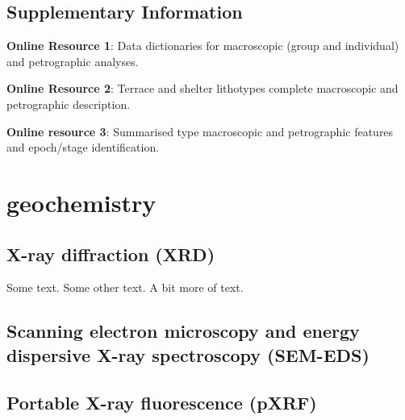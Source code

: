 \documentclass[
  a4paper,
  DIV=11,
  numbers=noendperiod]{scrreprt}
\begin{document}
\section*{Supplementary Information}\label{supplementary-information}


\textbf{Online Resource 1}: Data dictionaries for macroscopic (group and
individual) and petrographic analyses.

\textbf{Online Resource 2}: Terrace and shelter lithotypes complete
macroscopic and petrographic description.

\textbf{Online resource 3}: Summarised type macroscopic and petrographic
features and epoch/stage identification.


\chapter{geochemistry}\label{geochemistry}

\section{X-ray diffraction (XRD)}\label{x-ray-diffraction-xrd}

Some text. Some other text. A bit more of text.

\section{Scanning electron microscopy and energy dispersive X-ray
spectroscopy
(SEM-EDS)}\label{scanning-electron-microscopy-and-energy-dispersive-x-ray-spectroscopy-sem-eds}

\section{Portable X-ray fluorescence
(pXRF)}\label{portable-x-ray-fluorescence-pxrf}
\end{document}
